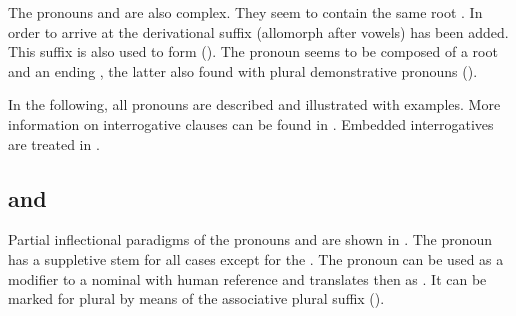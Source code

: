 The pronouns  and  are also complex. They seem to contain the same root . In order to arrive at  the derivational suffix  (allomorph \mbox{} after vowels) has been added. This suffix is also used to form  (). The pronoun  seems to be composed of a root  and an ending , the latter also found with plural demonstrative pronouns ().

In the following, all pronouns are described and illustrated with examples. More information on interrogative clauses can be found in . Embedded interrogatives are treated in .



\subsection{  and  }
\label{ssec:ca who and ce what}

Partial inflectional paradigms of the pronouns   and   are shown in . The pronoun  has a suppletive stem  for all cases except for the  . The pronoun  can be used as a modifier to a nominal with human reference and translates then as  . It can be marked for plural by means of the associative plural suffix   ().

